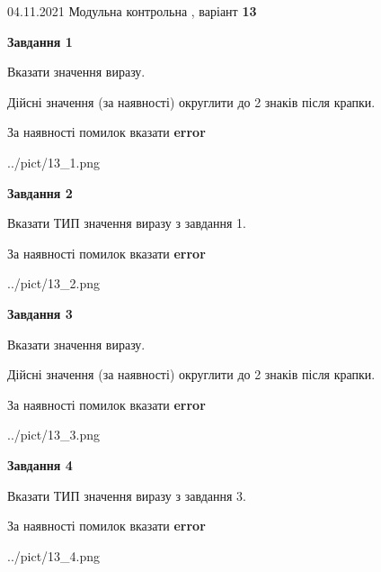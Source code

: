 \documentclass[11pt, ukrainian]{article}
\begin{document}
{04.11.2021 Модульна контрольна , варіант  \No \textbf { 13 }\par}
{
\begin {large}
{\begin {center}\textbf{Завдання 1}\end {center}}\par
Вказати значення виразу. \par
Дійсні значення (за наявності) округлити до 2 знаків після крапки. \par
За наявності помилок вказати \textbf{error}

\begin{center}
	{../pict/13_1.png}
\end{center}
\newpage

{\begin {center}\textbf{Завдання 2}\end {center}}\par
Вказати ТИП значення виразу з завдання 1. \par
За наявності помилок вказати \textbf{error}

\begin{center}
	{../pict/13_2.png}
\end{center}
\newpage

{\begin {center}\textbf{Завдання 3}\end {center}}\par
Вказати значення виразу. \par
Дійсні значення (за наявності) округлити до 2 знаків після крапки. \par
За наявності помилок вказати \textbf{error}

\begin{center}
	{../pict/13_3.png}
\end{center}
\newpage

{\begin {center}\textbf{Завдання 4}\end {center}}\par
Вказати ТИП значення виразу з завдання 3. \par
За наявності помилок вказати \textbf{error}

\begin{center}
	{../pict/13_4.png}
\end{center}
\newpage


\end{large}}
\end{document}
